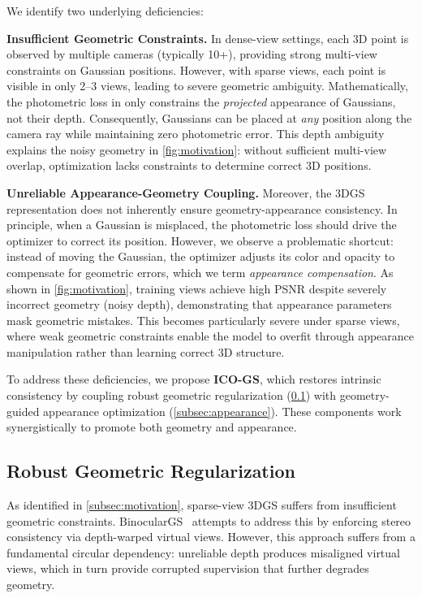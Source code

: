   We identify two underlying deficiencies:
  
  \noindent\textbf{Insufficient Geometric Constraints.} 
  In dense-view settings, each 3D point is observed by multiple cameras (typically 10+), 
  providing strong multi-view constraints on Gaussian positions. 
  However, with sparse views, each point is visible in only 2--3 views, leading to 
  severe geometric ambiguity. 
  Mathematically, the photometric loss in \cite{kerbl20233d} only constrains the 
  \emph{projected} appearance of Gaussians, not their depth. 
  Consequently, Gaussians can be placed at \emph{any} position along the camera ray 
  while maintaining zero photometric error. 
  This depth ambiguity explains the noisy geometry in \cref{fig:motivation}: without 
  sufficient multi-view overlap, optimization lacks constraints to determine correct 
  3D positions.
    
  \noindent\textbf{Unreliable Appearance-Geometry Coupling.} 
  Moreover, the 3DGS representation does not inherently ensure geometry-appearance 
  consistency. 
  In principle, when a Gaussian is misplaced, the photometric loss should drive the 
  optimizer to correct its position. 
  However, we observe a problematic shortcut: instead of moving the Gaussian, the 
  optimizer adjusts its color and opacity to compensate for geometric errors, which 
  we term \emph{appearance compensation}.
  As shown in \cref{fig:motivation}, training views achieve high PSNR despite 
  severely incorrect geometry (noisy depth), demonstrating that appearance parameters 
  mask geometric mistakes. 
  This becomes particularly severe under sparse views, where weak geometric constraints 
  enable the model to overfit through appearance manipulation rather than learning 
  correct 3D structure.
  
  To address these deficiencies, we propose \textbf{ICO-GS}, which restores intrinsic 
  consistency by coupling robust geometric regularization (\cref{subsec:geometry}) 
  with geometry-guided appearance optimization (\cref{subsec:appearance}). 
  These components work synergistically to promote both geometry and appearance.
  


\subsection{Robust Geometric Regularization}
\label{subsec:geometry}
As identified in \cref{subsec:motivation}, sparse-view 3DGS suffers from insufficient geometric constraints. 
BinocularGS~\cite{han2024binocular} attempts to address this by enforcing stereo consistency via depth-warped virtual views. 
However, this approach suffers from a fundamental circular dependency: unreliable depth produces misaligned virtual views, which in turn provide corrupted supervision that further degrades geometry.

